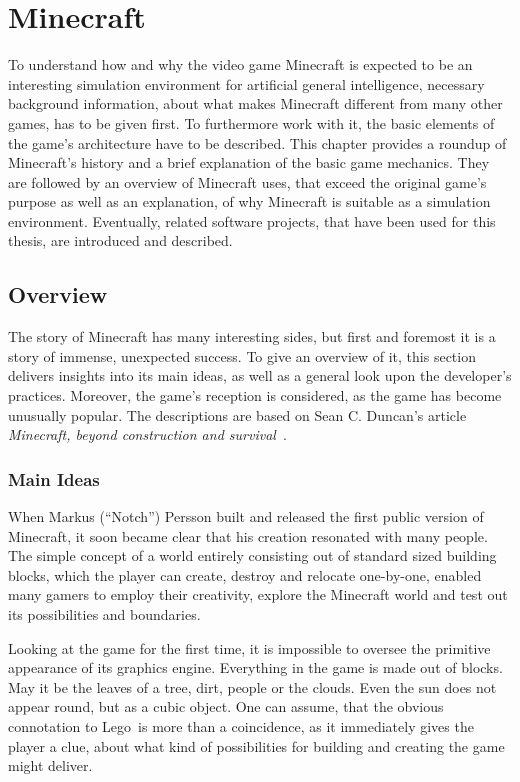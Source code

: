 \chapter{Minecraft}
To understand how and why the video game Minecraft is expected to be an interesting simulation environment for artificial general intelligence, necessary background information, about what makes Minecraft different from many other games, has to be given first. To furthermore work with it, the basic elements of the game's architecture have to be described. This chapter provides a roundup of Minecraft's history and a brief explanation of the basic game mechanics. They are followed by an overview of Minecraft uses, that exceed the original game's purpose as well as an explanation, of why Minecraft is suitable as a simulation environment. Eventually, related software projects, that have been used for this thesis, are introduced and described.

    \section{Overview}
The story of Minecraft has many interesting sides, but first and foremost it is a story of immense, unexpected success. To give an overview of it, this section delivers insights into its main ideas, as well as a general look upon the developer's practices. Moreover, the game's reception is considered, as the game has become unusually popular. The descriptions are based on Sean C. Duncan's article \emph{Minecraft, beyond construction and survival}~\cite{Duncan:2011:MBC:2207096.2207097}.
    
        \subsection{Main Ideas}
When Markus (``Notch'') Persson built and released the first public version of Minecraft, it soon became clear that his creation resonated with many people. The simple concept of a world entirely consisting out of standard sized building blocks, which the player can create, destroy and relocate one-by-one, enabled many gamers to employ their creativity, explore the Minecraft world and test out its possibilities and boundaries.

Looking at the game for the first time, it is impossible to oversee the primitive appearance of its graphics engine. Everything in the game is made out of blocks. May it be the leaves of a tree, dirt, people or the clouds. Even the sun does not appear round, but as a cubic object. One can assume, that the obvious connotation to Lego\texttrademark~is more than a coincidence, as it immediately gives the player a clue, about what kind of possibilities for building and creating the game might deliver.

